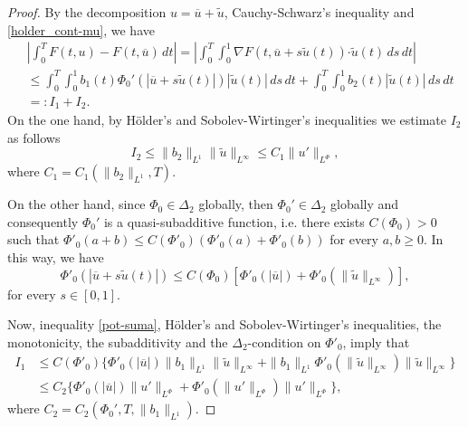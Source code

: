 \documentclass[twoside]{article}
\theoremstyle{remark}
\newcommand{\orlnor}{\|_{L^{\Phi}}}
\renewcommand{\b}[1]{\boldsymbol{#1}}
\newcommand{\ccdot}{\b{\cdot}}
\renewcommand{\leq}{\leqslant}
\renewcommand{\geq}{\geqslant}
\begin{document}
\begin{proof}
By the decomposition $u=\overline{u}+\tilde{u}$,   Cauchy-Schwarz's inequality
and \eqref{holder_cont-mu}, we have
\begin{equation}\label{cota-diferencia-F}
\begin{split}
&\left|\int_0^T F(t,u)-F(t,\overline{u})\,dt\right|=
\left|\int_0^T \int_0^1 \nabla F(t,\overline{u}+s\tilde{u}(t))\ccdot \tilde{u}(t) \,ds \,dt\right|
\\
&\leq \int_0^T \int_0^1 b_1(t)\Phi_0'(|\overline{u}+s\tilde{u}(t)|)|\tilde{u}(t)|\,ds\,dt+
\int_0^T \int_0^1 b_2(t)|\tilde{u}(t)|\,ds\,dt
\\
&=:I_1+I_2.
\end{split}
\end{equation}
On the one hand, by H\"older's and Sobolev-Wirtinger's inequalities we estimate $I_2$ as follows
\begin{equation}\label{cota-i2}
I_2\leq \|b_2\|_{L^1} \|\tilde{u}\|_{L^{\infty}}\leq
C_1\|u'\orlnor,
\end{equation}
 where $C_1=C_1(\|b_2\|_{L^1}, T)$. 

On the other hand, since $\Phi_0 \in \Delta_2$ globally, then $\Phi_0' \in \Delta_2$ globally and
consequently $\Phi_0'$ is a quasi-subadditive function, i.e. there exists $C(\Phi_0)>0$ such that
$\Phi'_0(a+b)\leq C(\Phi'_0)(\Phi'_0(a)+\Phi'_0(b))$ for every $a,b\geq 0$.
In this way, we have
\begin{equation}\label{pot-suma}
\Phi'_0(|\overline{u}+s\tilde{u}(t)|)\leq
C(\Phi_0)[\Phi'_0(|\overline{u}|)+\Phi'_0(\|\tilde{u}\|_{L^{\infty}})],
\end{equation}
for every $s \in [0,1]$. 

Now,  inequality \eqref{pot-suma}, H\"older's and Sobolev-Wirtinger's inequalities,
 the monotonicity, the subadditivity and  the $\Delta_2$-condition on $\Phi'_0$, imply that
\begin{equation}\label{cota-i1}
\begin{split}
I_1&
\leq C(\Phi'_0)\bigg\{ \Phi'_0(|\overline{u}|) \|b_1\|_{L^1} \|\tilde{u}\|_{L^{\infty}}+
 \|b_1\|_{L^1}\Phi'_0(\|\tilde{u}\|_{L^\infty})\|\tilde{u}\|_{L^\infty}\bigg\}
\\
&\leq C_2 \bigg\{ \Phi'_0(|\overline{u}|) \|u'\orlnor
+\Phi'_0(\|u'\orlnor) \|u'\orlnor\bigg\},
\end{split}
\end{equation}
where $C_2=C_2(\Phi_0',T, \|b_1\|_{L^1} )$.


\end{proof}
\end{document}

